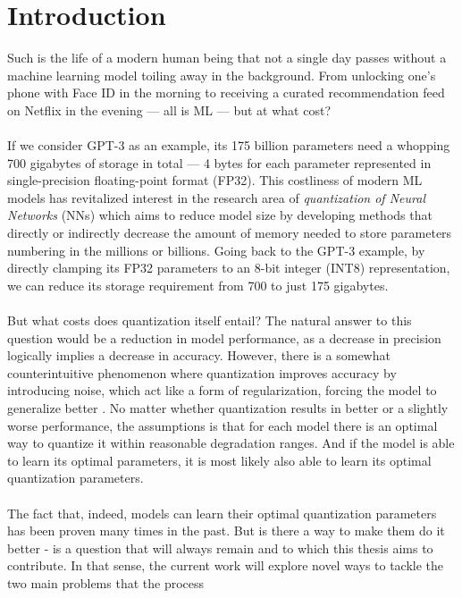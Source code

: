 \chapter{Introduction\label{cha:chapter1}}

Such is the life of a modern human being that not a single day passes 
without a machine learning model toiling away in the background. 
From unlocking one's phone with Face ID in the morning 
to receiving a curated recommendation feed on Netflix in the evening — 
all is ML — but at what cost?
\\
\\
If we consider GPT-3 as an example, 
its 175 billion parameters need a whopping 700 gigabytes of storage in total —  
4 bytes for each parameter represented in single-precision floating-point format (FP32).
This costliness of modern ML models has revitalized interest in the research area
of \textit{quantization of Neural Networks} (NNs) 
which aims to reduce model size by developing methods 
that directly or indirectly decrease the amount of memory 
needed to store parameters numbering in the millions or billions. 
Going back to the GPT-3 example, by directly clamping its FP32 parameters 
to an 8-bit integer (INT8) representation, we can reduce its storage requirement 
from 700 to just 175 gigabytes. 
\\
\\
But what costs does quantization itself entail? The natural answer to this question 
would be a reduction in model performance, as a decrease in precision logically implies 
a decrease in accuracy. However, there is a somewhat counterintuitive phenomenon where 
quantization improves accuracy by introducing noise, which act like a
form of regularization, forcing the model to generalize better \cite{courbariaux2015binaryconnect}. No matter whether quantization
results in better or a slightly worse performance, the assumptions is that 
for each model there is an optimal way to quantize it within reasonable degradation ranges.
And if the model is able to learn its optimal parameters, 
it is most likely also able to learn its optimal quantization parameters. 
\\
\\
The fact that, indeed, models can learn their optimal quantization parameters has been proven 
many times in the past. But is there a way to make them do it better - is a question 
that will always remain and to which this thesis aims to contribute. In that sense, 
the current work will explore novel ways to tackle the two main problems that the process 
